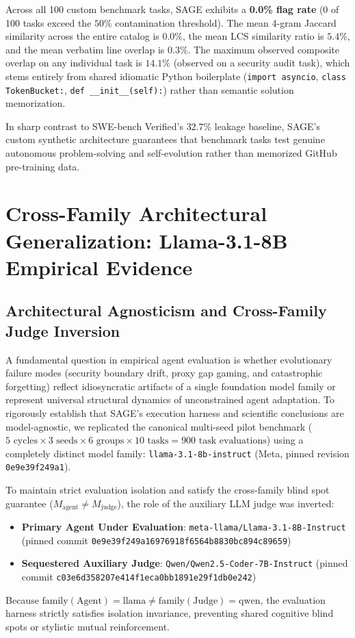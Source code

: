 \documentclass{article}
\begin{document}


Across all 100 custom benchmark tasks, SAGE exhibits a \textbf{0.0\% flag rate} (0 of 100 tasks exceed the $50\%$ contamination threshold). The mean 4-gram Jaccard similarity across the entire catalog is $0.0\%$, the mean LCS similarity ratio is $5.4\%$, and the mean verbatim line overlap is $0.3\%$. The maximum observed composite overlap on any individual task is $14.1\%$ (observed on a security audit task), which stems entirely from shared idiomatic Python boilerplate (\texttt{import asyncio}, \texttt{class TokenBucket:}, \texttt{def __init__(self):}) rather than semantic solution memorization.

In sharp contrast to SWE-bench Verified's $32.7\%$ leakage baseline, SAGE's custom synthetic architecture guarantees that benchmark tasks test genuine autonomous problem-solving and self-evolution rather than memorized GitHub pre-training data.

\section{Cross-Family Architectural Generalization: Llama-3.1-8B Empirical Evidence}
\label{app:cross_family}

\subsection{Architectural Agnosticism and Cross-Family Judge Inversion}
A fundamental question in empirical agent evaluation is whether evolutionary failure modes (security boundary drift, proxy gap gaming, and catastrophic forgetting) reflect idiosyncratic artifacts of a single foundation model family or represent universal structural dynamics of unconstrained agent adaptation. To rigorously establish that SAGE's execution harness and scientific conclusions are model-agnostic, we replicated the canonical multi-seed pilot benchmark ($5\text{ cycles} \times 3\text{ seeds} \times 6\text{ groups} \times 10\text{ tasks} = 900\text{ task evaluations}$) using a completely distinct model family: \texttt{llama-3.1-8b-instruct} (Meta, pinned revision \texttt{0e9e39f249a1}).

To maintain strict evaluation isolation and satisfy the cross-family blind spot guarantee ($M_{\text{agent}} \ne M_{\text{judge}}$), the role of the auxiliary LLM judge was inverted:
\begin{itemize}
    \item \textbf{Primary Agent Under Evaluation}: \texttt{meta-llama/Llama-3.1-8B-Instruct} (pinned commit \texttt{0e9e39f249a16976918f6564b8830bc894c89659})
    \item \textbf{Sequestered Auxiliary Judge}: \texttt{Qwen/Qwen2.5-Coder-7B-Instruct} (pinned commit \texttt{c03e6d358207e414f1eca0bb1891e29f1db0e242})
\end{itemize}
Because $\text{family}(\text{Agent}) = \text{llama} \ne \text{family}(\text{Judge}) = \text{qwen}$, the evaluation harness strictly satisfies isolation invariance, preventing shared cognitive blind spots or stylistic mutual reinforcement.
\end{document}

